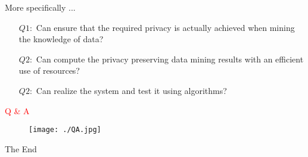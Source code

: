 \documentclass{beamer} %
\newcommand{\red}[1]{\textcolor{red}{#1}}
\begin{document}


\begin{frame}
More specifically ...
\begin{itemize} \itemsep2pt \parskip0pt 
    \item[$Q1:$] Can ensure that the required privacy is actually achieved when mining the knowledge of data?
    \item[$Q2:$] Can compute the privacy preserving data mining results with an efficient use of resources?
    \item[$Q2:$] Can realize the system and test it using algorithms?
\end{itemize}
\end{frame}







\begin{frame}
\Huge{\centerline{\red{Q \& A}}}
\begin{figure}[H]
\centering
\texttt{[image: ./QA.jpg]}
\end{figure}
\end{frame}



\begin{frame}
\Huge{\centerline{The End}}
\end{frame}
\end{document}
